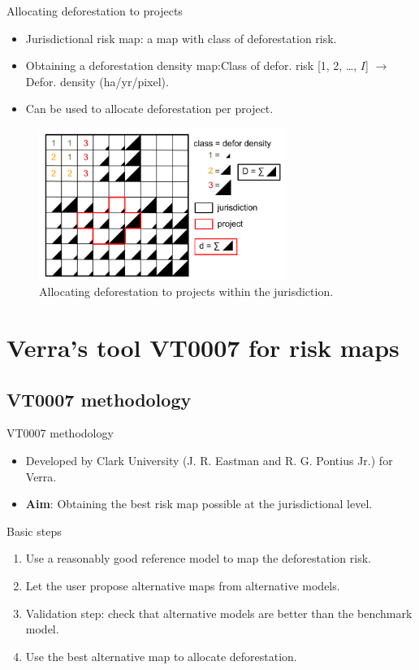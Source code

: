 \documentclass[10pt,table,dvipsnames,compress]{beamer}
\begin{document}
\begin{frame}[label={sec:orge2adc64}]{Allocating deforestation to projects}
\begin{itemize}
\item Jurisdictional risk map: a map with class of deforestation risk.
\item Obtaining a deforestation density map:\newline Class of defor. risk [1, 2, \ldots{}, \(I\)] \(\rightarrow\) Defor. density (ha/yr/pixel).
\item Can be used to allocate deforestation per project.
\end{itemize}

\begin{figure}[htbp]
\centering
\includegraphics[width=8cm]{figs/get_started/allocation.png}
\caption{Allocating deforestation to projects within the jurisdiction.}
\end{figure}
\end{frame}

\section{Verra's tool VT0007 for risk maps}
\label{sec:orgfec914b}

\subsection{VT0007 methodology}
\label{sec:orgaa7c778}

\begin{frame}[label={sec:org62bb88c}]{VT0007 methodology}
\begin{itemize}
\item Developed by Clark University (J. R. Eastman and R. G. Pontius Jr.) for Verra.
\item \textbf{Aim}: Obtaining the best risk map possible at the jurisdictional level.
\end{itemize}

\begin{block}{Basic steps}
\begin{enumerate}
\item Use a reasonably good reference model to map the deforestation risk.
\item Let the user propose alternative maps from alternative models.
\item Validation step: check that alternative models are better than the benchmark model.
\item Use the best alternative map to allocate deforestation.
\end{enumerate}
\end{block}
\end{frame}
\end{document}
